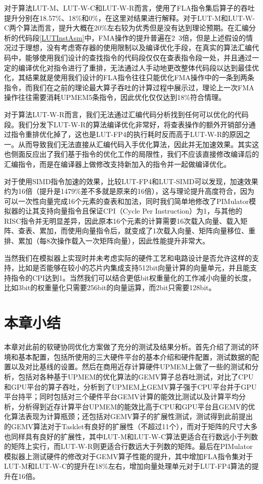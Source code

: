 对于算法LUT-M、LUT-W-C和LUT-W-R而言，使用了FLA指令集后算子的吞吐提升分别在18.57\%、18\%和0\%，在这里对结果进行解释。对于LUT-M和LUT-W-C两个算法而言，提升大概在20\%左右较为优秀但是没有达到理论预期。在汇编分析的代码段\ref{LUTInstAsm}中，FMA操作的提升普遍在2~3倍，但是上述假设的情况过于理想，没有考虑寄存器的使用限制以及编译优化手段，在真实的算法汇编代码中，能够使用我们设计的查找指令的代码段仅仅在查表指令段一处，并且通过一定的编译优化对指令进行了重排，无法通过人手动地更改整体代码段以达到最佳优化，其结果就是使用我们设计的FLA指令往往只能优化FMA操作中的一条到两条指令，而我们在之前的理论最大算子吞吐的计算过程中展示过，理论上一次FMA操作往往需要消耗UPMEM5条指令，因此优化仅仅达到18\%符合情理。

对于算法LUT-W-R而言，我们无法通过汇编代码分析找到任何可以优化的代码段。我们分发下LUT-W-R的算法编译优化非常好，将查表操作的额外开销部分通过指令重排优化掉了，这也是LUT-FP4的执行耗时反而高于LUT-W-R的原因之一。从而导致我们无法直接从汇编代码入手优化算法，因此并无加速效果。其实这也侧面反应出了我们基于指令的优化工作的局限性，我们不应该直接修改编译后的汇编指令，而是在编译器上做修改支持新加入的指令并一起做编译优化。

对于使用SIMD指令加速的效果，比较LUT-FP4和LUT-SIMD可以发现，加速效果约为16倍（提升是1479\%差不多就是原来的16倍），这与理论提升高度符合，因为可以一次性向量完成16个元素的查表和加法，同时我们简单地修改了PIMulator模拟器的让其支持向量指令且保证CPI（Cycle Per Instruction）为1，与其他的RISC指令并无明显差异，因此原本16个元素的计算需要16次载入向量、载入矩阵、查表、累加，而使用向量指令后，就变成了1次载入向量、矩阵向量移位、重排、累加（每8次操作载入一次矩阵向量），因此性能提升非常大。

当然我们在模拟器上实现时并未考虑实际的硬件工艺和电路设计是否允许这样的支持，比如是否能够在较小的芯片内集成支持512bit向量计算的向量单元，并且能支持指令的CPI达到1。当然我们可以结合更低bit权重量化的工作减小向量的长度，比如3bit的权重量化只需要256bit的向量运算，而2bit只需要128bit。

\section{本章小结}
本章对此前的软硬协同优化方案做了充分的测试及结果分析。首先介绍了测试的环境和基本配置，包括所使用的三大硬件平台的基本介绍和硬件配置，测试数据的配置以及对比基线的设置。然后在商用近存计算硬件UPMEM上做了一些的测试和分析，包括对各种基于UPMEM的优化算法的GEMV算子总吞吐测试，对比了CPU和GPU平台的算子吞吐，分析到了UPMEM上GEMV算子强于CPU平台并于GPU平台持平；同时包括对三个硬件平台GEMV计算的能效比测试以及计算平均分析，分析得到近存计算平台UPMEM的能效比高于CPU和GPU平台且GEMV的优化算法表现为计算瓶颈；还包括对GEMV算子的扩展性测试，测试得到此前提出的GEMV算法对于Tasklet有良好的扩展性（不超过11个），而对于矩阵的尺寸大多也同样具有良好的扩展性，其中LUT-M和LUT-W-C算法更适合在行数远小于列数的矩阵上实行，而LUT-W-R则更适合行数远大于列数的矩阵。最后在PIMulator模拟器上测试硬件的修改对于GEMV算子性能的提升，其中增加FLA指令集对于LUT-M和LUT-W-C的提升在18\%左右，增加向量处理单元对于LUT-FP4算法的提升在16倍。